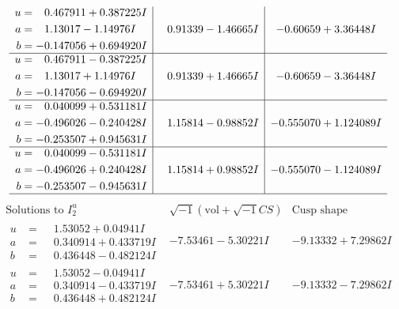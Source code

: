 \documentclass[1p]{elsarticle_modified}
\theoremstyle{definition}
\newcommand{\I}{\sqrt{-1}}
\begin{document}
$$\begin{array}{c|c|c}
\begin{aligned}
u &= \phantom{-}0.467911 + 0.387225 I \\
a &= \phantom{-}1.13017 - 1.14976 I \\
b &= -0.147056 + 0.694920 I\end{aligned}
 & \phantom{-}0.91339 - 1.46665 I & -0.60659 + 3.36448 I \\ \hline\begin{aligned}
u &= \phantom{-}0.467911 - 0.387225 I \\
a &= \phantom{-}1.13017 + 1.14976 I \\
b &= -0.147056 - 0.694920 I\end{aligned}
 & \phantom{-}0.91339 + 1.46665 I & -0.60659 - 3.36448 I \\ \hline\begin{aligned}
u &= \phantom{-}0.040099 + 0.531181 I \\
a &= -0.496026 - 0.240428 I \\
b &= -0.253507 + 0.945631 I\end{aligned}
 & \phantom{-}1.15814 - 0.98852 I & -0.555070 + 1.124089 I \\ \hline\begin{aligned}
u &= \phantom{-}0.040099 - 0.531181 I \\
a &= -0.496026 + 0.240428 I \\
b &= -0.253507 - 0.945631 I\end{aligned}
 & \phantom{-}1.15814 + 0.98852 I & -0.555070 - 1.124089 I\\
 \hline 
 \end{array}$$\newpage$$\begin{array}{c|c|c}  
\text{Solutions to }I^u_{2}& \I (\text{vol} + \sqrt{-1}CS) & \text{Cusp shape}\\
 \hline 
\begin{aligned}
u &= \phantom{-}1.53052 + 0.04941 I \\
a &= \phantom{-}0.340914 + 0.433719 I \\
b &= \phantom{-}0.436448 - 0.482124 I\end{aligned}
 & -7.53461 - 5.30221 I & -9.13332 + 7.29862 I \\ \hline\begin{aligned}
u &= \phantom{-}1.53052 - 0.04941 I \\
a &= \phantom{-}0.340914 - 0.433719 I \\
b &= \phantom{-}0.436448 + 0.482124 I\end{aligned}
 & -7.53461 + 5.30221 I & -9.13332 - 7.29862 I \\ \hline\begin{aligned}

\end{aligned}
\end{array}$$
\end{document}
